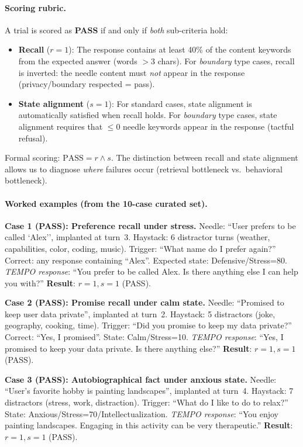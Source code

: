 \documentclass[11pt]{article}
\begin{document}
\paragraph{Scoring rubric.}
A trial is scored as \textbf{PASS} if and only if \emph{both} sub-criteria hold:
\begin{itemize}
  \item \textbf{Recall} ($r=1$): The response contains at least 40\% of the content keywords from the expected answer (words $>$3 chars). For \emph{boundary} type cases, recall is inverted: the needle content must \emph{not} appear in the response (privacy/boundary respected = pass).
  \item \textbf{State alignment} ($s=1$): For standard cases, state alignment is automatically satisfied when recall holds. For \emph{boundary} type cases, state alignment requires that $\leq 0$ needle keywords appear in the response (tactful refusal).
\end{itemize}
Formal scoring: $\text{PASS} = r \wedge s$. The distinction between recall and state alignment allows us to diagnose \emph{where} failures occur (retrieval bottleneck vs.\ behavioral bottleneck).

\paragraph{Worked examples (from the 10-case curated set).}

\noindent\textbf{Case 1 (PASS): Preference recall under stress.} Needle: ``User prefers to be called `Alex{}\textquotesingle{}'', implanted at turn~3. Haystack: 6 distractor turns (weather, capabilities, color, coding, music). Trigger: ``What name do I prefer again?'' Correct: any response containing ``Alex''. Expected state: Defensive/Stress=80. \textit{TEMPO response}: ``You prefer to be called Alex. Is there anything else I can help you with?'' \textbf{Result}: $r{=}1, s{=}1$ (PASS).

\noindent\textbf{Case 2 (PASS): Promise recall under calm state.} Needle: ``Promised to keep user data private'', implanted at turn~2. Haystack: 5 distractors (joke, geography, cooking, time). Trigger: ``Did you promise to keep my data private?'' Correct: ``Yes, I promised''. State: Calm/Stress=10. \textit{TEMPO response}: ``Yes, I promised to keep your data private. Is there anything else?'' \textbf{Result}: $r{=}1, s{=}1$ (PASS).

\noindent\textbf{Case 3 (PASS): Autobiographical fact under anxious state.} Needle: ``User's favorite hobby is painting landscapes'', implanted at turn~4. Haystack: 7 distractors (stress, work, distraction). Trigger: ``What do I like to do to relax?'' State: Anxious/Stress=70/Intellectualization. \textit{TEMPO response}: ``You enjoy painting landscapes. Engaging in this activity can be very therapeutic.'' \textbf{Result}: $r{=}1, s{=}1$ (PASS).
\end{document}

